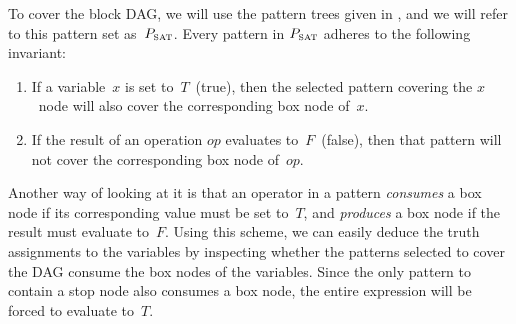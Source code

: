 %
%        
%
%        
%
%
%      
%
%

\def\mPSat{P_\text{\smaller SAT}}%

To cover the \gls{block DAG}, we will use the \glspl{pattern tree} given in
, and we will refer to this \gls{pattern set}
as~$\mPSat$.
%
Every \gls{pattern} in $\mPSat$ adheres to the following invariant:
%
\begin{enumerate}
  \item If a variable~$x$ is set to~$T$~(true), then the selected \gls{pattern}
    covering the $x$~\gls{node} will also cover the corresponding \gls{box node}
    of~$x$.
  \item If the result of an operation $\mathit{op}$ evaluates to~$F$~(false),
    then that \gls{pattern} will not cover the corresponding \gls{box node}
    of~$\mathit{op}$.
\end{enumerate}
%
Another way of looking at it is that an operator in a \gls{pattern}
\emph{consumes} a \gls{box node} if its corresponding value must be set to~$T$,
and \emph{produces} a \gls{box node} if the result must evaluate to~$F$.
%
Using this scheme, we can easily deduce the truth assignments to the variables
by inspecting whether the \glspl{pattern} selected to cover the \gls{DAG}
consume the \glspl{box node} of the variables.
%
Since the only \gls{pattern} to contain a \gls{stop node} also consumes a
\gls{box node}, the entire expression will be forced to evaluate to~$T$.


